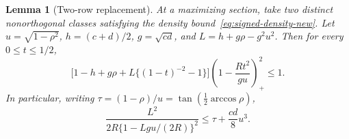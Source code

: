 \documentclass[11pt,a4paper]{article}
\newtheorem{lemma}[theorem]{Lemma}
\theoremstyle{remark}\newtheorem{remark}[theorem]{Remark}
\numberwithin{equation}{section}
\begin{document}
\begin{lemma}[Two-row replacement]\label{lem:two-row-comparison}
At a maximizing section, take two distinct nonorthogonal classes
satisfying the density bound~\eqref{eq:signed-density-new}.
Let \(u=\sqrt{1-\rho^2}\), \(h=(c+d)/2\), \(g=\sqrt{cd}\), and
\(L=h+g\rho-g^2u^2\). Then for every \(0\le t\le1/2\),
\begin{equation}\label{eq:exact-strip-law}
 \big[1-h+g\rho+L\{(1-t)^{-2}-1\}\big]
 \left(1-\frac{Rt^2}{gu}\right)_+^2\le1 .
\end{equation}
In particular, writing \(\tau=(1-\rho)/u=\tan(\tfrac12\arccos\rho)\),
\begin{equation}\label{eq:direct-strip-law}
 \frac{L^2}{2R\{1-Lgu/(2R)\}^2}\le \tau+\frac{cd}{8}u^3 .
\end{equation}
\end{lemma}
\end{document}
